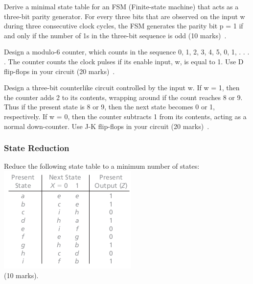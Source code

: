 % 
% 
% 
% 
\begin{prob}
  Derive a minimal state table for an FSM (Finite-state machine) that acts as a
three-bit parity generator. For every three bits that are observed on the input
w during three consecutive clock cycles, the FSM generates the parity bit p = 1
if and only if the number of 1s in the three-bit sequence is odd (10
marks)~\cite[Prob 6.12]{brown2013fundamentals}.
\end{prob}

\begin{prob}
  Design a modulo-6 counter, which counts in the sequence 0, 1, 2, 3, 4, 5, 0,
1, . . . . The counter counts the clock pulses if its enable input, w, is equal
to 1. Use D flip-flops in your circuit (20 marks)~\cite[Prob 6.23]{brown2013fundamentals}.
\end{prob}


\begin{prob}
  Design a three-bit counterlike circuit controlled by the input w. If w = 1,
then the counter adds 2 to its contents, wrapping around if the count reaches 8
or 9. Thus if the present state is 8 or 9, then the next state becomes 0 or 1,
respectively. If w = 0, then the counter subtracts 1 from its contents, acting
as a normal down-counter. Use J-K flip-flops in your circuit (20
marks)~\cite[Prob 6.26]{brown2013fundamentals}.
\end{prob}

\subsubsection*{State Reduction}
\begin{prob}
  Reduce the following state table to a minimum number of states:\\
  \includegraphics[width=0.5\linewidth]{fig-15.2.png}\\
  (10 marks).
\end{prob}

